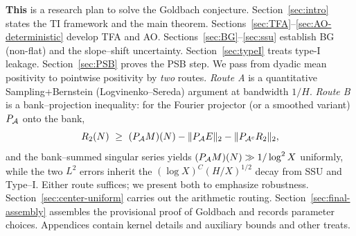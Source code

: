 \noindent\textbf{This} is a research plan to solve the Goldbach conjecture.
Section~\ref{sec:intro} states the TI framework and the main theorem.
Sections~\ref{sec:TFA}--\ref{sec:AO-deterministic} develop TFA and AO.
Sections~\ref{sec:BG}--\ref{sec:ssu} establish BG (non-flat) and the slope--shift uncertainty.
Section~\ref{sec:typeI} treats type-I leakage. Section~\ref{sec:PSB} proves the PSB step.
We pass from dyadic mean positivity to pointwise positivity by \emph{two} routes.
\emph{Route A} is a quantitative Sampling+Bernstein (Logvinenko–Sereda) argument at bandwidth $1/H$.
\emph{Route B} is a bank–projection inequality: for the Fourier projector (or a smoothed variant) $P_{\mathcal{A}}$ onto the bank,
\[
R_2(N)\ \ge\ (P_{\mathcal{A}} M)(N) - \|P_{\mathcal{A}}E\|_2 - \|P_{\mathcal{A}^c}R_2\|_2,
\]
and the bank–summed singular series yields $(P_{\mathcal{A}} M)(N)\gg 1/\log^2 X$ uniformly, while the two $L^2$ errors inherit the $ (\log X)^C(H/X)^{1/2}$ decay from SSU and Type–I.
Either route suffices; we present both to emphasize robustness.
Section~\ref{sec:center-uniform} carries out the arithmetic routing. Section~\ref{sec:final-assembly} assembles the provisional proof of Goldbach and records parameter choices. Appendices contain kernel details and auxiliary bounds and other treats.

